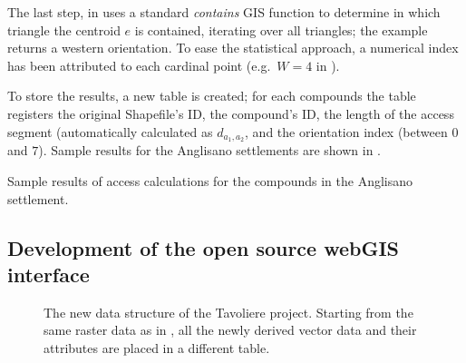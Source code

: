                 The last step, in  uses a standard \emph{contains} GIS function to determine in which triangle the centroid $e$ is contained, iterating over all triangles; the example returns a western orientation. To ease the statistical approach, a numerical index has been attributed to each cardinal point (e.g.\ $W = 4$ in ).

                To store the results, a new table is created; for each compounds the table registers the original Shapefile's ID, the compound's ID, the length of the access segment (automatically calculated as $d_{a_1, a_2}$, and the orientation index (between $0$ and $7$). Sample results for the Anglisano settlements are shown in .
                \begin{table}[!htb]
                    \centering
                    
                    \caption[Sample results of access calculations for the compounds in the Anglisano settlement.]{Sample results of access calculations for the compounds in the Anglisano settlement.}
                    \label{tab:tab-access-anglisano}
                \end{table}

        \subsection{Development of the open source webGIS interface}

            \begin{figure}[H]
                \centering
                \caption[The three diffrent tables to store compound's derived data.]{The new data structure of the Tavoliere project. Starting from the same raster data as in , all the newly derived vector data and their attributes are placed in a different table.}
                \label{fig:scheme-derive-2}
            \end{figure}

